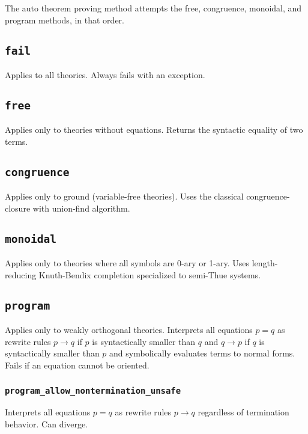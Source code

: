 \documentclass[10pt]{book}
\begin{document}
The auto theorem proving method attempts the free, congruence, monoidal, and program methods, in that order.

 \subsection{{\tt fail}}
 
 Applies to all theories.  Always fails with an exception.
 
  \subsection{{\tt free}}
  
  Applies only to theories without equations.  Returns the syntactic equality of two terms.

\subsection{{\tt congruence}}

 Applies only to ground (variable-free theories).  Uses the classical congruence-closure with union-find algorithm.

\subsection{{\tt monoidal}}

Applies only to theories where all symbols are 0-ary or 1-ary.  Uses length-reducing Knuth-Bendix completion specialized to semi-Thue systems.

\subsection{{\tt program}}

Applies only to weakly orthogonal theories.  Interprets all equations $p = q$ as rewrite rules $p \to q$ if $p$ is syntactically smaller than $q$ and $q \to p$ if $q$ is syntactically smaller than $p$ and symbolically evaluates terms to normal forms.  Fails if an equation cannot be oriented.

\subsubsection{{\tt program\_allow\_nontermination\_unsafe}}

Interprets all equations $p = q$ as rewrite rules $p \to q$ regardless of termination behavior.  Can diverge.
\end{document}
